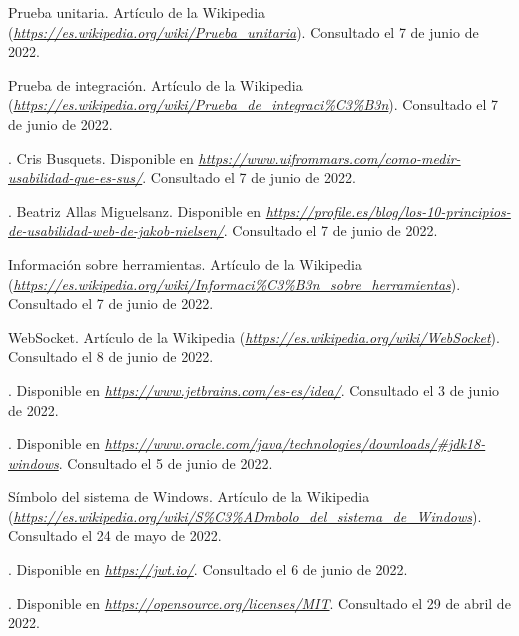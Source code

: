 \begin{thebibliography}{99}
 Prueba unitaria. Artículo de la Wikipedia ({\it \url{https://es.wikipedia.org/wiki/Prueba_unitaria}}). Consultado el 7 de junio de 2022.

 Prueba de integración. Artículo de la Wikipedia ({\it \url{https://es.wikipedia.org/wiki/Prueba_de_integraci%C3%B3n}}). Consultado el 7 de junio de 2022.

. Cris Busquets. Disponible en {\it \url{https://www.uifrommars.com/como-medir-usabilidad-que-es-sus/}}. Consultado el 7 de junio de 2022.

. Beatriz Allas Miguelsanz. Disponible en {\it \url{https://profile.es/blog/los-10-principios-de-usabilidad-web-de-jakob-nielsen/}}. Consultado el 7 de junio de 2022.

 Información sobre herramientas. Artículo de la Wikipedia ({\it \url{https://es.wikipedia.org/wiki/Informaci%C3%B3n_sobre_herramientas}}). Consultado el 7 de junio de 2022.

 WebSocket. Artículo de la Wikipedia ({\it \url{https://es.wikipedia.org/wiki/WebSocket}}). Consultado el 8 de junio de 2022.

. Disponible en {\it \url{https://www.jetbrains.com/es-es/idea/}}. Consultado el 3 de junio de 2022.

. Disponible en {\it \url{https://www.oracle.com/java/technologies/downloads/#jdk18-windows}}. Consultado el 5 de junio de 2022.

 Símbolo del sistema de Windows. Artículo de la Wikipedia ({\it \url{https://es.wikipedia.org/wiki/S%C3%ADmbolo_del_sistema_de_Windows}}). Consultado el 24 de mayo de 2022.

. Disponible en {\it \url{https://jwt.io/}}. Consultado el 6 de junio de 2022.

. Disponible en {\it \url{https://opensource.org/licenses/MIT}}. Consultado el 29 de abril de 2022.
\end{thebibliography}